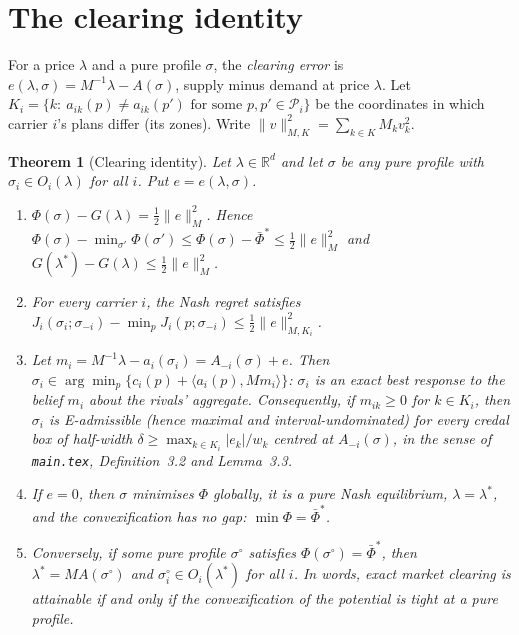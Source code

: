 \documentclass[11pt]{article}
\newtheorem{theorem}{Theorem}
\theoremstyle{definition}
\theoremstyle{remark}
\newcommand{\R}{\mathbb{R}}
\newcommand{\cP}{\mathcal{P}}
\newcommand{\ip}[2]{\langle #1,#2\rangle}
\begin{document}
\section{The clearing identity}\label{sec:clear}

For a price $\lambda$ and a pure profile $\sigma$, the \emph{clearing error} is $e(\lambda,\sigma)=M^{-1}\lambda-A(\sigma)$, supply minus demand at price $\lambda$. Let $K_i=\{k:\ a_{ik}(p)\ne a_{ik}(p')\text{ for some }p,p'\in\cP_i\}$ be the coordinates in which carrier $i$'s plans differ (its zones). Write $\|v\|^2_{M,K}=\sum_{k\in K}M_kv_k^2$.

\begin{theorem}[Clearing identity]\label{thm:clear}
Let $\lambda\in\R^d$ and let $\sigma$ be any pure profile with $\sigma_i\in O_i(\lambda)$ for all $i$. Put $e=e(\lambda,\sigma)$.
\begin{enumerate}[label=(\alph*)]
\item $\Phi(\sigma)-G(\lambda)=\tfrac12\|e\|_M^2$. Hence
$\Phi(\sigma)-\min_{\sigma'}\Phi(\sigma')\le\Phi(\sigma)-\bar\Phi^*\le\tfrac12\|e\|^2_M$ and $G(\lambda^*)-G(\lambda)\le\tfrac12\|e\|_M^2$.
\item For every carrier $i$, the Nash regret satisfies $J_i(\sigma_i;\sigma_{-i})-\min_pJ_i(p;\sigma_{-i})\le\tfrac12\|e\|^2_{M,K_i}$.
\item Let $m_i=M^{-1}\lambda-a_i(\sigma_i)=A_{-i}(\sigma)+e$. Then $\sigma_i\in\arg\min_p\{c_i(p)+\ip{a_i(p)}{Mm_i}\}$: $\sigma_i$ is an exact best response to the belief $m_i$ about the rivals' aggregate. Consequently, if $m_{ik}\ge0$ for $k\in K_i$, then $\sigma_i$ is E-admissible (hence maximal and interval-undominated) for every credal box of half-width $\delta\ge\max_{k\in K_i}|e_k|/w_k$ centred at $A_{-i}(\sigma)$, in the sense of \texttt{main.tex}, Definition~3.2 and Lemma~3.3.
\item If $e=0$, then $\sigma$ minimises $\Phi$ globally, it is a pure Nash equilibrium, $\lambda=\lambda^*$, and the convexification has no gap: $\min\Phi=\bar\Phi^*$.
\item Conversely, if some pure profile $\sigma^\circ$ satisfies $\Phi(\sigma^\circ)=\bar\Phi^*$, then $\lambda^*=MA(\sigma^\circ)$ and $\sigma^\circ_i\in O_i(\lambda^*)$ for all $i$. In words, exact market clearing is attainable if and only if the convexification of the potential is tight at a pure profile.
\end{enumerate}
\end{theorem}
\end{document}
